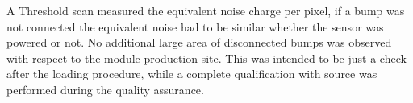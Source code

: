 A Threshold scan measured the equivalent noise charge per pixel, if a bump was not connected the equivalent noise had to be similar whether the sensor was powered or not.
No additional large area of disconnected bumps was observed with respect to the module production site. This was intended to be just a check after the loading procedure, while a complete qualification with source was performed during the quality assurance.


